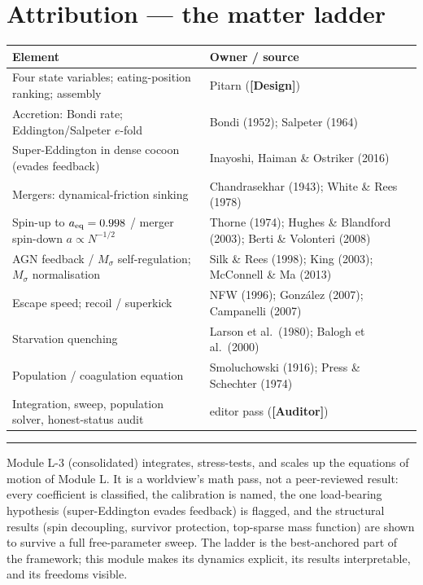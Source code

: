 \documentclass[11pt]{article}
\newcommand{\Design}{\textbf{\textcolor{purple!65!black}{[Design]}}}
\newcommand{\Auditor}{\textbf{\textcolor{teal!55!black}{[Auditor]}}}
\newcommand{\Msig}{M_\sigma}
\begin{document}
\section{Attribution --- the matter ladder}
\begin{center}\small
\begin{tabular}{@{}p{}p{}@{}}
\toprule
Element & Owner / source \\
\midrule
Four state variables; eating-position ranking; assembly & Pitarn (\Design) \\
Accretion: Bondi rate; Eddington/Salpeter $e$-fold & Bondi (1952); Salpeter (1964) \\
Super-Eddington in dense cocoon (evades feedback) & Inayoshi, Haiman \& Ostriker (2016) \\
Mergers: dynamical-friction sinking & Chandrasekhar (1943); White \& Rees (1978) \\
Spin-up to $a_{\rm eq}=0.998$ / merger spin-down $a\!\propto\!N^{-1/2}$ & Thorne (1974); Hughes \& Blandford (2003); Berti \& Volonteri (2008) \\
AGN feedback / $\Msig$ self-regulation; $\Msig$ normalisation & Silk \& Rees (1998); King (2003); McConnell \& Ma (2013) \\
Escape speed; recoil / superkick & NFW (1996); Gonz\'alez (2007); Campanelli (2007) \\
Starvation quenching & Larson et al.\ (1980); Balogh et al.\ (2000) \\
Population / coagulation equation & Smoluchowski (1916); Press \& Schechter (1974) \\
Integration, sweep, population solver, honest-status audit & editor pass (\Auditor) \\
\bottomrule
\end{tabular}
\end{center}

\vspace{4pt}\hrule\vspace{4pt}
{\small Module L-3 (consolidated) integrates, stress-tests, and scales up the equations of motion of Module L. It is a worldview's math pass, not a peer-reviewed result: every coefficient is classified, the calibration is named, the one load-bearing hypothesis (super-Eddington evades feedback) is flagged, and the structural results (spin decoupling, survivor protection, top-sparse mass function) are shown to survive a full free-parameter sweep. The ladder is the best-anchored part of the framework; this module makes its dynamics explicit, its results interpretable, and its freedoms visible.}
\end{document}
